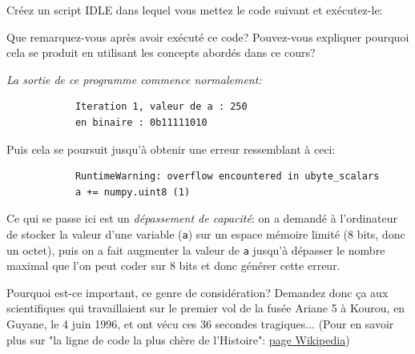 \documentclass[12pt]{article}
\newenvironment{MaReponse}
		{\begin{greyedtextbox}\itshape} %
		{\end{greyedtextbox}}            %
\begin{document}
	\begin{MonExo}
		Créez un script IDLE dans lequel vous mettez le code suivant et exécutez-le:
		
		
		
		Que remarquez-vous après avoir exécuté ce code? Pouvez-vous expliquer pourquoi cela se produit en utilisant les concepts abordés dans ce cours?
	\end{MonExo}
	\begin{MaReponse}
		La sortie de ce programme commence normalement:
		\begin{verbatim}
			Iteration 1, valeur de a : 250
			en binaire : 0b11111010
		\end{verbatim}
		Puis cela se poursuit jusqu'à obtenir une erreur ressemblant à ceci:
		\begin{verbatim}
			RuntimeWarning: overflow encountered in ubyte_scalars
			a += numpy.uint8 (1)
		\end{verbatim}
		Ce qui se passe ici est un \emph{dépassement de capacité}: on a demandé à l'ordinateur de stocker la valeur d'une variable (\texttt{a}) sur un espace mémoire limité (8 bits, donc un octet), puis on a fait augmenter la valeur de \texttt{a} jusqu'à dépasser le nombre maximal que l'on peut coder sur 8 bits et donc générer cette erreur.
	\end{MaReponse}
	
	Pourquoi est-ce important, ce genre de considération? Demandez donc ça aux scientifiques qui travaillaient sur le premier vol de la fusée Ariane 5 à Kourou, en Guyane, le 4 juin 1996, et ont vécu ces 36 secondes tragiques... (Pour en savoir plus sur "la ligne de code la plus chère de l'Histoire": 	\href{https://fr.wikipedia.org/wiki/Vol_501_d%27Ariane_5}{page Wikipedia})
\end{document}
